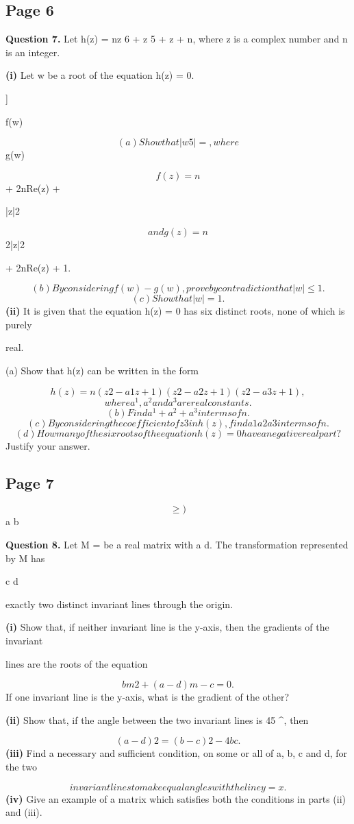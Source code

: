 \documentclass[12pt]{article}
\begin{document}
\subsection*{Page 6}
\begin{flushleft}
\bigskip\textbf{Question 7.} Let h(z) = nz 6 + z 5 + z + n, where z is a complex number and n  is an integer.\par
\textbf{(i)} Let w be a root of the equation h(z) = 0.\par
]\par
f(w)\par
\[(a) Show that |w 5| = , where\]
g(w)\par
\[f(z) = n\]
+ 2nRe(z) +\par
|z|2\par
\[and g(z) = n\]
2|z|2\par
+ 2nRe(z) + 1.\par
\[(b) By considering f(w) - g(w), prove by contradiction that |w| \leq 1.\]
\[(c) Show that |w| = 1.\]
\textbf{(ii)} It is given that the equation h(z) = 0 has six distinct roots, none of which is purely\par
real.\par
(a) Show that h(z) can be written in the form\par
\[h(z) = n(z 2 - a1z + 1)(z 2 - a2z + 1)(z 2 - a3z + 1),\]
\[where a^1, a^2 and a^3 are real constants.\]
\[(b) Find a^1 + a^2 + a^3 in terms of n.\]
\[(c) By considering the coefficient of z 3 in h(z), find a1a2a3 in terms of n.\]
\[(d) How many of the six roots of the equation h(z) = 0 have a negative real part?\]
Justify your answer.\par
\end{flushleft}
\subsection*{Page 7}
\begin{flushleft}
\[\geq )\]
a b\par
\bigskip\textbf{Question 8.} Let M = be a real matrix with a \ne d. The transformation represented by M has\par
c d\par
exactly two distinct invariant lines through the origin.\par
\textbf{(i)} Show that, if neither invariant line is the y-axis, then the gradients of the invariant\par
lines are the roots of the equation\par
\[bm 2 + (a - d)m - c = 0.\]
If one invariant line is the y-axis, what is the gradient of the other?\par
\textbf{(ii)} Show that, if the angle between the two invariant lines is 45 \textasciicircum{}\circ , then\par
\[(a - d) 2 = (b - c) 2 - 4bc.\]
\textbf{(iii)} Find a necessary and sufficient condition, on some or all of a, b, c and d, for the two\par
\[invariant lines to make equal angles with the line y = x.\]
\textbf{(iv)} Give an example of a matrix which satisfies both the conditions in parts (ii) and (iii).\par
\end{flushleft}
\end{document}
